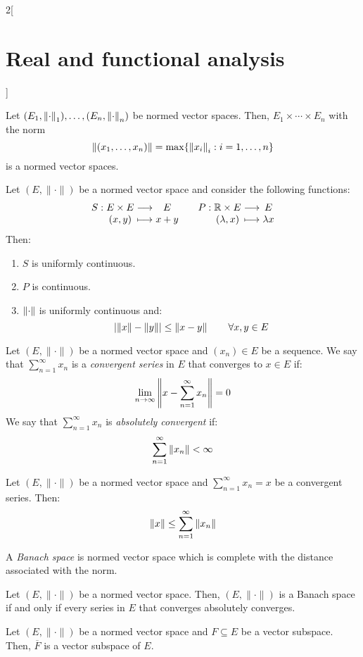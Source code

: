 \documentclass[../../../main_math.tex]{subfiles}
\begin{document}
\begin{multicols}{2}[\section{Real and functional analysis}]
\begin{definition}
  \end{definition}
  \begin{proposition}
    Let $(E_1,\left\|\cdot\right\|_1),\ldots,(E_n,\left\|\cdot\right\|_n)$ be normed vector spaces. Then, $E_1\times\cdots\times E_n$ with the norm $$\left\|(x_1,\ldots,x_n)\right\|=\max\{{\left\|x_i\right\|}_i:i=1,\ldots,n\}$$ is a normed vector spaces.
  \end{proposition}
  \begin{proposition}
    Let $(E,\|\cdot\|)$ be a normed vector space and consider the following functions:
    $$\function{S}{E\times E}{E}{(x,y)}{x+y}\quad\function{P}{\RR\times E}{E}{(\lambda,x)}{\lambda x}$$ Then:
    \begin{enumerate}
      \item $S$ is uniformly continuous.
      \item $P$ is continuous.
      \item $\left\|\cdot\right\|$ is uniformly continuous and: $$\abs{\left\|x\right\|-\left\|y\right\|}\leq\left\|x-y\right\|\qquad\forall x,y\in E$$
    \end{enumerate}
  \end{proposition}
  \begin{definition}
    Let $(E,\|\cdot\|)$ be a normed vector space and $(x_n)\in E$ be a sequence. We say that $\sum_{n=1}^\infty x_n$ is a \emph{convergent series} in $E$ that converges to $x\in E$ if: $$\lim_{n\to\infty}\left\|x-\sum_{n=1}^\infty x_n\right\|=0 $$
    We say that $\sum_{n=1}^\infty x_n$ is \emph{absolutely convergent} if: $$\sum_{n=1}^\infty\left\|x_n\right\|<\infty$$
  \end{definition}
  \begin{proposition}
    Let $(E,\|\cdot\|)$ be a normed vector space and $\sum_{n=1}^\infty x_n=x$ be a convergent series. Then: $$\left\|x\right\|\leq \sum_{n=1}^\infty\left\|x_n\right\|$$
  \end{proposition}
  \begin{definition}
    A \emph{Banach space} is normed vector space which is complete with the distance associated with the norm.
  \end{definition}
  \begin{theorem}
    Let $(E,\|\cdot\|)$ be a normed vector space. Then, $(E,\|\cdot\|)$ is a Banach space if and only if every series in $E$ that converges absolutely converges.
  \end{theorem}
  \begin{proposition}
    Let $(E,\|\cdot\|)$ be a normed vector space and $F\subseteq E$ be a vector subspace. Then, $\overline{F}$ is a vector subspace of $E$.

\end{proposition}
\end{multicols}
\end{document}
